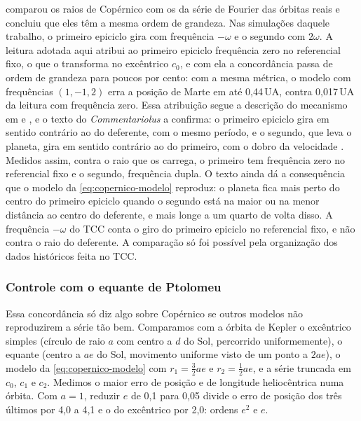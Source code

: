  comparou os raios de Copérnico com os da série de Fourier das órbitas reais e concluiu que eles têm a mesma ordem de grandeza. Nas simulações daquele trabalho, o primeiro epiciclo gira com frequência $-\omega$ e o segundo com $2\omega$. A leitura adotada aqui atribui ao primeiro epiciclo frequência zero no referencial fixo, o que o transforma no excêntrico $c_0$, e com ela a concordância passa de ordem de grandeza para poucos por cento: com a mesma métrica, o modelo com frequências $(1, -1, 2)$ erra a posição de Marte em até 0,44\,UA, contra 0,017\,UA da leitura com frequência zero. Essa atribuição segue a descrição do mecanismo em  e , e o texto do \emph{Commentariolus} a confirma: o primeiro epiciclo gira em sentido contrário ao do deferente, com o mesmo período, e o segundo, que leva o planeta, gira em sentido contrário ao do primeiro, com o dobro da velocidade \cite[p.~74--75]{rosen1939}. Medidos assim, contra o raio que os carrega, o primeiro tem frequência zero no referencial fixo e o segundo, frequência dupla. O texto ainda dá a consequência que o modelo da \autoref{eq:copernico-modelo} reproduz: o planeta fica mais perto do centro do primeiro epiciclo quando o segundo está na maior ou na menor distância ao centro do deferente, e mais longe a um quarto de volta disso. A frequência $-\omega$ do TCC conta o giro do primeiro epiciclo no referencial fixo, e não contra o raio do deferente. A comparação só foi possível pela organização dos dados históricos feita no TCC.

\subsubsection{Controle com o equante de Ptolomeu}\label{sec:controle-ptolomeu}

Essa concordância só diz algo sobre Copérnico se outros modelos não reproduzirem a série tão bem. Comparamos com a órbita de Kepler o excêntrico simples (círculo de raio $a$ com centro a $d$ do Sol, percorrido uniformemente), o equante (centro a $ae$ do Sol, movimento uniforme visto de um ponto a $2ae$), o modelo da \autoref{eq:copernico-modelo} com $r_1 = \frac32 ae$ e $r_2 = \frac12 ae$, e a série truncada em $c_0$, $c_1$ e $c_2$. Medimos o maior erro de posição e de longitude heliocêntrica numa órbita. Com $a=1$, reduzir $e$ de 0,1 para 0,05 divide o erro de posição dos três últimos por 4,0 a 4,1 e o do excêntrico por 2,0: ordens $e^2$ e $e$.

